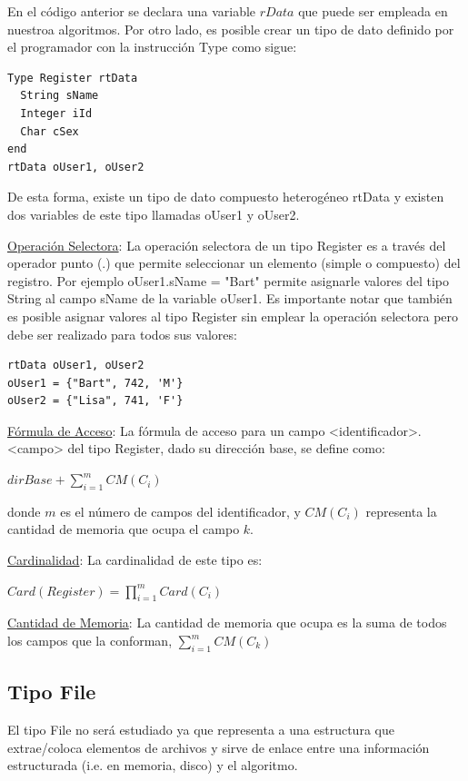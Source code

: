 En el código anterior se declara una variable $rData$ que puede ser empleada en nuestroa algoritmos. Por otro lado, es posible crear un tipo de dato definido por el programador con la instrucción Type como sigue:

\begin{lstlisting}[upquote=true, language=pseudo]
Type Register rtData
  String sName
  Integer iId
  Char cSex
end
rtData oUser1, oUser2
\end{lstlisting}

De esta forma, existe un tipo de dato compuesto heterogéneo rtData y existen dos variables de este tipo llamadas oUser1 y oUser2.

\underline{Operación Selectora}: La operación selectora de un tipo Register es a través del operador punto (.) que permite seleccionar un elemento (simple o compuesto) del registro. Por ejemplo oUser1.sName = "Bart" permite asignarle valores del tipo String al campo sName de la variable oUser1. Es importante notar que también es posible asignar valores al tipo Register sin emplear la operación selectora pero debe ser realizado para todos sus valores:
\begin{lstlisting}[upquote=true, language=pseudo]
rtData oUser1, oUser2
oUser1 = {"Bart", 742, 'M'}
oUser2 = {"Lisa", 741, 'F'}
\end{lstlisting}

\underline{Fórmula de Acceso}: La fórmula de acceso para un campo <identificador>.<campo> del tipo Register, dado su dirección base, se define como:

$dirBase + \sum_{i=1}^{m}{CM(C_i)}$

\noindent donde $m$ es el número de campos del identificador, y $CM(C_i)$ representa la cantidad de memoria que ocupa el campo $k$.

\underline{Cardinalidad}: La cardinalidad de este tipo es:

$Card(Register) = \prod_{i=1}^{m}Card(C_i)$

\underline{Cantidad de Memoria}: La cantidad de memoria que ocupa es la suma de todos los campos que la conforman, $\sum_{i=1}^{m}CM(C_k)$

\subsection{Tipo File}

El tipo File no será estudiado ya que representa a una estructura que extrae/coloca elementos de archivos y sirve de enlace entre una información estructurada (i.e. en memoria, disco) y el algoritmo.

